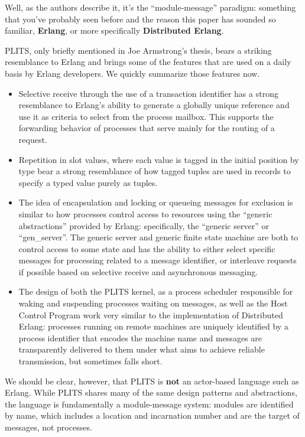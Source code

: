 Well, as the authors describe it, it's the ``module-message'' paradigm: something that you've probably seen before and the reason this paper has sounded so familiar, \textbf{Erlang}, or more specifically \textbf{Distributed Erlang}.  

PLITS, only briefly mentioned in Joe Armstrong's thesis, bears a striking resemblance to Erlang and brings some of the features that are used on a daily basis by Erlang developers.  We quickly summarize those features now.

\begin{itemize}
\item Selective receive through the use of a transaction identifier has a strong resemblance to Erlang's ability to generate a globally unique reference and use it as criteria to select from the process mailbox.  This supports the forwarding behavior of processes that serve mainly for the routing of a request.
\item Repetition in slot values, where each value is tagged in the initial position by type bear a strong resemblance of how tagged tuples are used in records to specify a typed value purely as tuples.  
\item The idea of encapsulation and locking or queueing messages for exclusion is similar to how processes control access to resources using the ``generic abstractions'' provided by Erlang: specifically, the ``generic server'' or ``gen\_server''.  The generic server and generic finite state machine are both to control access to some state and has the ability to either select specific messages for processing related to a message identifier, or interleave requests if possible based on selective receive and asynchronous messaging.
\item The design of both the PLITS kernel, as a process scheduler responsible for waking and suspending processes waiting on messages, as well as the Host Control Program work very similar to the implementation of Distributed Erlang: processes running on remote machines are uniquely identified by a process identifier that encodes the machine name and messages are transparently delivered to them under what aims to achieve reliable transmission, but sometimes falls short.
\end{itemize}

We should be clear, however, that PLITS is \textbf{not} an actor-based language such as Erlang.  While PLITS shares many of the same design patterns and abstractions, the language is fundamentally a module-message system: modules are identified by name, which includes a location and incarnation number and are the target of messages, not processes.
